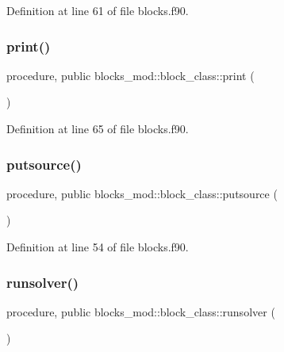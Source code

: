 Definition at line 61 of file blocks.\+f90.

\mbox{\label{structblocks__mod_1_1block__class_a43b4c133934eaadb55d30cf834d1e28c}} 
\subsubsection{\texorpdfstring{print()}{print()}}
{\footnotesize\ttfamily procedure, public blocks\+\_\+mod\+::block\+\_\+class\+::print (\begin{DoxyParamCaption}{ }\end{DoxyParamCaption})}



Definition at line 65 of file blocks.\+f90.

\mbox{\label{structblocks__mod_1_1block__class_ac79980e841902691a06212dce50f6331}} 
\subsubsection{\texorpdfstring{putsource()}{putsource()}}
{\footnotesize\ttfamily procedure, public blocks\+\_\+mod\+::block\+\_\+class\+::putsource (\begin{DoxyParamCaption}{ }\end{DoxyParamCaption})}



Definition at line 54 of file blocks.\+f90.

\mbox{\label{structblocks__mod_1_1block__class_abe738c65f3fecf013c3884275a3fe7e4}} 
\subsubsection{\texorpdfstring{runsolver()}{runsolver()}}
{\footnotesize\ttfamily procedure, public blocks\+\_\+mod\+::block\+\_\+class\+::runsolver (\begin{DoxyParamCaption}{ }\end{DoxyParamCaption})}



